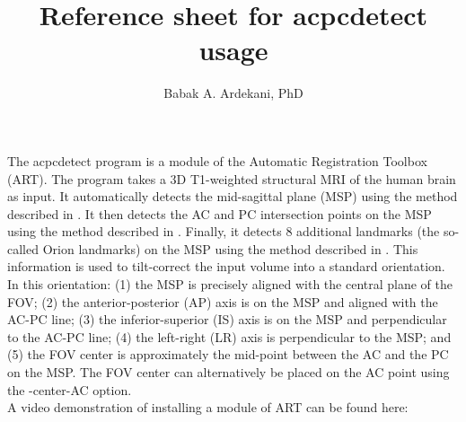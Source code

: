 \documentclass[11pt]{article}
\title{Reference sheet for acpcdetect usage}
\author{Babak A. Ardekani, PhD}
\begin{document}
\maketitle
{} 
The acpcdetect program is a module of the Automatic Registration Toolbox (ART). 
The program takes a 3D T1-weighted structural MRI of the human brain as input. 
It automatically detects the mid-sagittal plane (MSP) using the method described in \citep{pmid9533596}.
It then detects the AC and PC intersection points on the MSP using the method described in \citep{pmid19264138}. 
Finally, it detects 8 additional landmarks (the so-called Orion landmarks) on the MSP using the method 
described in \citep{ardekani2018}.  
This information is used to tilt-correct the input volume into a standard orientation.  
In this orientation: (1) the MSP is precisely aligned with the central plane of the FOV; 
(2) the anterior-posterior (AP) axis is on the MSP and aligned with the AC-PC line; 
(3) the inferior-superior (IS) axis is on the MSP and perpendicular to the AC-PC line; 
(4) the left-right (LR) axis is perpendicular to the MSP; and 
(5) the FOV center is approximately the mid-point between the AC and the PC on the MSP. 
The FOV center can alternatively be placed on the AC point using the -center-AC option.  \\

A video demonstration of installing a module of ART can be found here:
\end{document}
